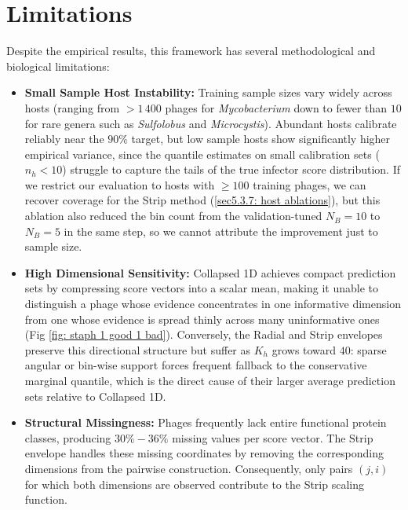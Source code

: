 \section{Limitations}
\label{sec6.2: limitations}

Despite the empirical results, this framework has several methodological and biological limitations:

\begin{itemize}
    \item \textbf{Small Sample Host Instability:} Training sample sizes vary widely across hosts (ranging from
          $>1\,400$ phages for \emph{Mycobacterium} down to fewer than $10$ for rare genera such as \emph{Sulfolobus}
          and \emph{Microcystis}). Abundant hosts calibrate reliably near the $90\%$ target, but low sample hosts
          show significantly higher empirical variance, since the quantile estimates on small calibration sets ($n_h < 10$)
          struggle to capture the tails of the true infector score distribution. If we restrict our evaluation to hosts
          with $\geq 100$ training phages, we can recover coverage for the Strip method (\ref{sec5.3.7: host ablations}), 
          but this ablation also reduced the bin count from the validation-tuned $N_B = 10$ to $N_B = 5$ in the same step, 
          so we cannot attribute the improvement just to sample size.
         
    \item \textbf{High Dimensional Sensitivity:} Collapsed 1D achieves compact prediction sets by 
          compressing score vectors into a scalar mean, making it unable to distinguish a phage whose evidence concentrates in 
          one informative dimension from one whose evidence is spread thinly across many uninformative ones (Fig \ref{fig: 
          staph 1 good 1 bad}). Conversely, the Radial and Strip envelopes preserve this directional structure but suffer as 
          $K_h$ grows toward $40$: sparse angular or bin-wise support forces frequent fallback to the conservative marginal 
          quantile, which is the direct cause of their larger average prediction sets relative to Collapsed 1D.

    \item \textbf{Structural Missingness:} Phages frequently lack entire functional protein classes, producing
           $30\%-36\%$ missing values per score vector. The Strip envelope handles these missing coordinates by removing the 
           corresponding dimensions from the pairwise construction. Consequently, only pairs $(j,i)$ for which both dimensions are
           observed contribute to the Strip scaling function.


\end{itemize}
